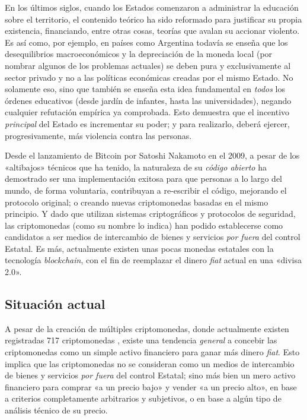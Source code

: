 \documentclass[12pt,a4paper]{article}
\begin{document}
En los últimos siglos, cuando los Estados comenzaron a administrar la educación sobre el territorio, el contenido teórico ha sido reformado para justificar su propia existencia, financiando, entre otras cosas, teorías que avalan su accionar violento. Es así como, por ejemplo, en países como Argentina todavía se enseña que los desequilibrios macroeconómicos y la depreciación de la moneda local (por nombrar algunos de los problemas actuales) se deben pura y exclusivamente al sector privado y no a las políticas económicas creadas por el mismo Estado. No solamente eso, sino que también se enseña esta idea fundamental en \textit{todos} los órdenes educativos (desde jardín de infantes, hasta las universidades), negando cualquier refutación empírica ya comprobada. Esto demuestra que el incentivo \textit{principal} del Estado es incrementar su poder; y para realizarlo, deberá ejercer, progresivamente, más violencia contra las personas.

Desde el lanzamiento de Bitcoin por Satoshi Nakamoto en el 2009, a pesar de los «altibajos» técnicos que ha tenido, la naturaleza de su \textit{código abierto} ha demostrado ser una implementación exitosa para que personas a lo largo del mundo, de forma voluntaria, contribuyan a re-escribir el código, mejorando el protocolo original; o creando nuevas criptomonedas basadas en el mismo principio. Y dado que utilizan sistemas criptográficos y protocolos de seguridad, las criptomonedas (como su nombre lo indica) han podido establecerse como candidatos a ser medios de intercambio de bienes y servicios \textit{por fuera} del control Estatal. Es más, actualmente existen unas pocas monedas estatales con la tecnología \textit{blockchain}, con el fin de reemplazar el dinero \textit{fiat} actual en una «divisa 2.0».

\subsection{Situación actual}
A pesar de la creación de múltiples criptomonedas, donde actualmente existen registradas 717	criptomonedas \cite{mps}, existe una tendencia \textit{general} a concebir las criptomonedas como un simple activo financiero para ganar más dinero \textit{fiat}. Esto implica que las criptomonedas no se consideran como un medios de intercambio de bienes y servicios \textit{por fuera} del control Estatal; sino más bien un mero activo financiero para comprar «a un precio bajo» y vender «a un precio alto», en base a criterios completamente arbitrarios y subjetivos, o en base a algún tipo de análisis técnico de su precio.
\end{document}
